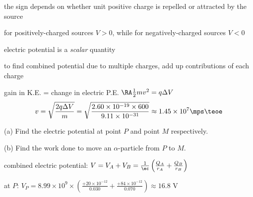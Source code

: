 the sign depends on whether unit positive charge is repelled or attracted by the source

for positively-charged sources $V>0$, while for negatively-charged sources $V<0$

\cmt electric potential is a \emph{scalar} quantity

to find combined potential due to multiple charges, add up contributions of each charge


\sol gain in K.E. = change in electric P.E. $\RA \frac{1}{2}mv^2 = q\Delta V$
\eqyskip\begin{equation*}
	v = \sqrt{\frac{2q\Delta V}{m}} = \sqrt{\frac{2\time 1.60\times10^{-19}\times600}{9.11\times10^{-31}}} \approx 1.45\times10^7 \mps \teoe
\end{equation*}


\begin{figure}[ht]
	\centering
\end{figure}

(a) Find the electric potential at point $P$ and point $M$ respectively.

(b) Find the work done to move an $\alpha$-particle from $P$ to $M$.

\sol combined electric potential: $V = V_A + V_B = \frac{1}{\ec}\left(\frac{Q_A}{r_A} + \frac{Q_B}{r_B} \right)$

\eqyskip

at $P$: $V_P = 8.99\times10^9 \times \left( \frac{+20 \times 10^{-12}}{0.030} + \frac{+84 \times 10^{-12}}{0.070} \right) \approx 16.8 \text{ V}$

